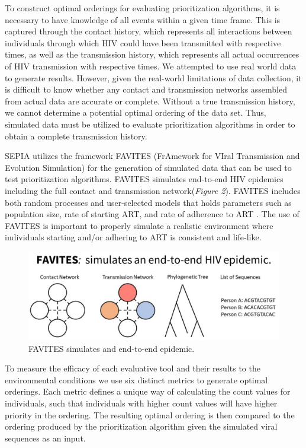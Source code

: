 \documentclass[twocolumn]{bmcart}%
\begin{document}
\begin{multicols}
To construct optimal orderings for evaluating prioritization algorithms, it is necessary to have knowledge of all events within a given time frame. This is captured through the contact history, which represents all interactions between individuals through which HIV could have been transmitted with respective times, as well as the transmission history, which represents all actual occurrences of HIV transmission with respective times. We attempted to use real world data to generate results. However, given the real-world limitations of data collection, it is difficult to know whether any contact and transmission networks assembled from actual data are accurate or complete. Without a true transmission history, we cannot determine a potential optimal ordering of the data set. Thus, simulated data must be utilized to evaluate prioritization algorithms in order to obtain a complete transmission history.

SEPIA utilizes the framework FAVITES (FrAmework for VIral Transmission and Evolution Simulation) for the generation of simulated data that can be used to test prioritization algorithms. FAVITES simulates end-to-end HIV epidemics including the full contact and transmission network(\textit{Figure 2}). FAVITES includes both random processes and user-selected models that holds parameters such as population size, rate of starting ART, and rate of adherence to ART \cite{moshiri2018favites}. The use of FAVITES is important to properly simulate a realistic environment where individuals starting and/or adhering to ART is consistent and life-like.

\begin{figure}[h!]
\centering
\includegraphics[scale=0.3]{Figures/FAVITES.png}
\caption{FAVITES simulates and end-to-end epidemic.}
\end{figure}

To measure the efficacy of each evaluative tool and their results to the environmental conditions we use six distinct metrics to generate optimal orderings. Each metric defines a unique way of calculating the count values for individuals, such that individuals with higher count values will have higher priority in the ordering. The resulting optimal ordering is then compared to the ordering produced by the prioritization algorithm given the simulated viral sequences as an input. 


\end{multicols}
\end{document}
